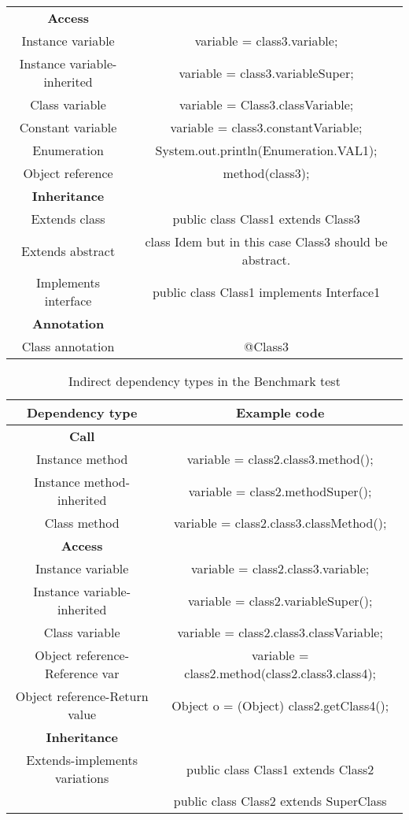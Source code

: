 \begin{table}
\begin{tabular}{|c c|}
        \textbf{Access} &  \\
        Instance variable & variable = class3.variable; \\
        Instance variable-inherited & variable = class3.variableSuper; \\
        Class variable & variable = Class3.classVariable; \\
        Constant variable & variable = class3.constantVariable; \\
        Enumeration & System.out.println(Enumeration.VAL1); \\
        Object reference & method(class3); \\
        \textbf{Inheritance} &  \\
        Extends class & public class Class1 extends Class3 { } \\
        Extends abstract & class Idem but in this case Class3 should be abstract. \\
        Implements interface & public class Class1 implements Interface1 { } \\
        \textbf{Annotation} &  \\
        Class annotation & @Class3 \\
        \hline
    \end{tabular}
\end{table}

\begin{table}
    \centering
    \caption{Indirect dependency types in the Benchmark test}
    \begin{tabular}{|c c|}
        \hline
        Dependency type & Example code \\
        \hline
        \textbf{Call} &  \\
        Instance method & variable = class2.class3.method(); \\
        Instance method-inherited & variable = class2.methodSuper(); \\
        Class method & variable = class2.class3.classMethod(); \\
        \textbf{Access} &  \\
        Instance variable & variable = class2.class3.variable; \\
        Instance variable-inherited & variable = class2.variableSuper(); \\
        Class variable & variable = class2.class3.classVariable; \\
        Object reference-Reference var & variable = class2.method(class2.class3.class4); \\
        Object reference-Return value & Object o = (Object) class2.getClass4(); \\
        \textbf{Inheritance} &  \\
        Extends-implements variations & public class Class1 extends Class2 { } \\
         & public class Class2 extends SuperClass { } \\
        \hline
    \end{tabular}
\end{table}

